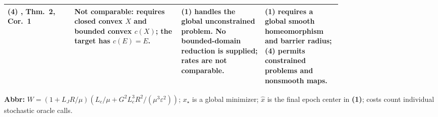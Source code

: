 \begin{table}[tp]
\begin{threeparttable}
\begin{tabularx}{\linewidth}{@{}>{\raggedright\arraybackslash}p{0.20\linewidth}>{\raggedright\arraybackslash}p{0.32\linewidth}>{\raggedright\arraybackslash}p{0.25\linewidth}>{\raggedright\arraybackslash}X@{}}
\midrule
\textbf{(4)} \citep{lhcsFatkhullin2024v2}, Thm.~2, Cor.~1 & Not comparable: requires closed convex $X$ and bounded convex $c(X)$; the target has $c(E)=E$. & \textbf{(1)} handles the global unconstrained problem. No bounded-domain reduction is supplied; rates are not comparable. & \textbf{(1)} requires a global smooth homeomorphism and barrier radius; \textbf{(4)} permits constrained problems and nonsmooth maps. \\
\bottomrule
\end{tabularx}
\begin{tablenotes}[flushleft]\footnotesize
\item[] \textbf{Abbr:} $W=(1+L_JR/\mu)(L_c/\mu+G^2L_c^3R^2/(\mu^3\varepsilon^2))$; $x_\star$ is a global minimizer; $\hat x$ is the final epoch center in \textbf{(1)}; costs count individual stochastic oracle calls.
\end{tablenotes}
\end{threeparttable}
\end{table}
\clearpage
